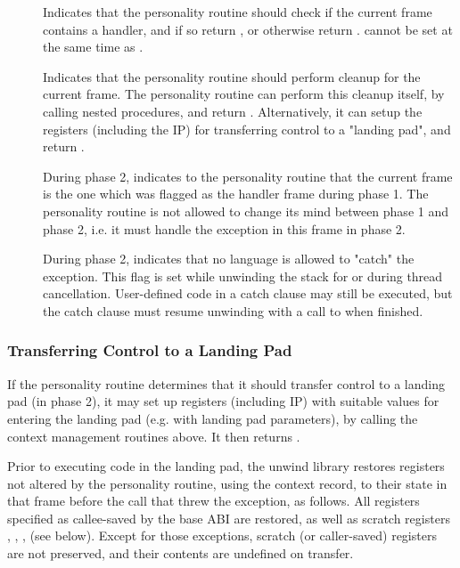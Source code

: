 \begin{description}
\item[] Indicates that the personality routine should
   check if the current frame contains a handler, and if so return
   , or otherwise return .
    cannot be set at the same time as .

\item[] Indicates that the personality routine should
   perform cleanup for the current frame. The personality routine can perform
   this cleanup itself, by calling nested procedures, and return
   . Alternatively, it can setup the registers
   (including the IP) for transferring control to a "landing pad", and
   return .

\item[]
   During phase 2, indicates to the personality routine that the current
   frame is the one which was flagged as the handler frame during phase 1.
   The personality routine is not allowed to change its mind between phase 1
   and phase 2, i.e. it must handle the exception in this frame in phase 2.

\item[] During phase 2, indicates that no language is
   allowed to "catch" the exception. This flag is set while unwinding the
   stack for  or during thread cancellation. User-defined code in a
   catch clause may still be executed, but the catch clause must resume
   unwinding with a call to  when finished.
\end{description}

\subsubsection{Transferring Control to a Landing Pad}

If the personality routine determines that it should transfer control to a
landing pad (in phase 2), it may set up registers (including IP) with
suitable values for entering the landing pad (e.g. with landing pad
parameters), by calling the context management routines above. It then
returns .

Prior to executing code in the landing pad, the unwind library restores
registers not altered by the personality routine, using the context
record, to their state in that frame before the call that threw the exception,
as follows. All registers specified as callee-saved by the base ABI are
restored, as well as scratch registers \RDI, \RSI, \RDX, \RCX (see below).
Except for those exceptions, scratch (or caller-saved) registers are not
preserved, and their contents are undefined on transfer.

